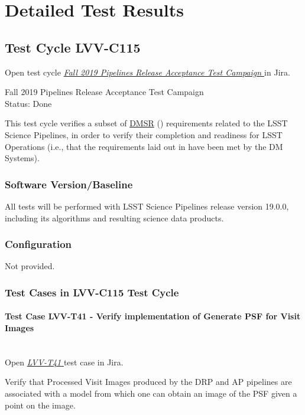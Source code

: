 \documentclass[DM,lsstdraft,STR,toc]{lsstdoc}
\begin{document}
\newpage
\section{Detailed Test Results}
\label{sect:detailedtestresults}

\subsection{Test Cycle LVV-C115 }

Open test cycle {\it \href{https://jira.lsstcorp.org/secure/Tests.jspa#/testrun/LVV-C115}{ Fall 2019 Pipelines Release Acceptance Test Campaign
}} in Jira.

 Fall 2019 Pipelines Release Acceptance Test Campaign
\\
Status: Done

 This test cycle verifies a subset of
\href{https://lse-61.lsst.io/}{DMSR} () requirements related to
the LSST Science Pipelines, in order to verify their completion and
readiness for LSST Operations (i.e., that the requirements laid out in
 have been met by the DM Systems).


\subsubsection{Software Version/Baseline}
 All tests will be performed with LSST Science Pipelines release version
19.0.0, including its algorithms and resulting science data products.~


\subsubsection{Configuration}
Not provided.

\subsubsection{Test Cases in LVV-C115 Test Cycle}

\paragraph{Test Case LVV-T41 -  Verify implementation of Generate PSF for Visit Images
 }\mbox{}\\

Open  \href{https://jira.lsstcorp.org/secure/Tests.jspa#/testCase/LVV-T41}{\textit{ LVV-T41 } }
test case in Jira.

 Verify that Processed Visit Images produced by the DRP and AP pipelines
are associated with a model from which one can obtain an image of the
PSF given a point on the image.
\end{document}
